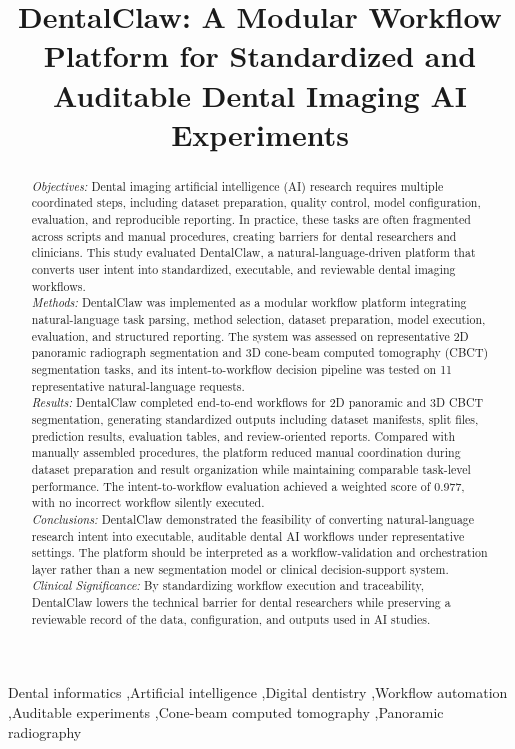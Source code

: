 \documentclass[final,5p,times,twocolumn]{elsarticle}
\begin{document}
\begin{frontmatter}

\title{DentalClaw: A Modular Workflow Platform for Standardized and Auditable Dental Imaging AI Experiments}

\begin{abstract}
\textit{Objectives:} Dental imaging artificial intelligence (AI) research requires multiple coordinated steps, including dataset preparation, quality control, model configuration, evaluation, and reproducible reporting. In practice, these tasks are often fragmented across scripts and manual procedures, creating barriers for dental researchers and clinicians. This study evaluated DentalClaw, a natural-language-driven platform that converts user intent into standardized, executable, and reviewable dental imaging workflows.\\
\textit{Methods:} DentalClaw was implemented as a modular workflow platform integrating natural-language task parsing, method selection, dataset preparation, model execution, evaluation, and structured reporting. The system was assessed on representative 2D panoramic radiograph segmentation and 3D cone-beam computed tomography (CBCT) segmentation tasks, and its intent-to-workflow decision pipeline was tested on 11 representative natural-language requests.\\
\textit{Results:} DentalClaw completed end-to-end workflows for 2D panoramic and 3D CBCT segmentation, generating standardized outputs including dataset manifests, split files, prediction results, evaluation tables, and review-oriented reports. Compared with manually assembled procedures, the platform reduced manual coordination during dataset preparation and result organization while maintaining comparable task-level performance. The intent-to-workflow evaluation achieved a weighted score of 0.977, with no incorrect workflow silently executed.\\
\textit{Conclusions:} DentalClaw demonstrated the feasibility of converting natural-language research intent into executable, auditable dental AI workflows under representative settings. The platform should be interpreted as a workflow-validation and orchestration layer rather than a new segmentation model or clinical decision-support system.\\
\textit{Clinical Significance:} By standardizing workflow execution and traceability, DentalClaw lowers the technical barrier for dental researchers while preserving a reviewable record of the data, configuration, and outputs used in AI studies.
\end{abstract}

\begin{keyword}
Dental informatics \sep Artificial intelligence \sep Digital dentistry \sep Workflow automation \sep Auditable experiments \sep Cone-beam computed tomography \sep Panoramic radiography
\end{keyword}

\end{frontmatter}
\end{document}
